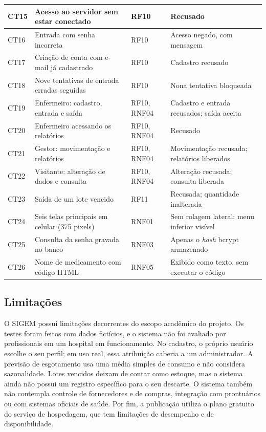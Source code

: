 \documentclass[12pt,a4paper]{article}
\begin{document}
{\begin{xltabular}{\textwidth}{|l|>{\raggedright\arraybackslash}X|l|>{\raggedright\arraybackslash}X|}
  CT15 & Acesso ao servidor sem estar conectado & RF10 & Recusado \\ \hline
  CT16 & Entrada com senha incorreta & RF10 & Acesso negado, com mensagem \\ \hline
  CT17 & Criação de conta com e-mail já cadastrado & RF10 & Cadastro recusado \\ \hline
  CT18 & Nove tentativas de entrada erradas seguidas & RF10 & Nona tentativa bloqueada \\ \hline
  CT19 & Enfermeiro: cadastro, entrada e saída & RF10, RNF04 & Cadastro e entrada recusados; saída aceita \\ \hline
  CT20 & Enfermeiro acessando os relatórios & RF10, RNF04 & Recusado \\ \hline
  CT21 & Gestor: movimentação e relatórios & RF10, RNF04 & Movimentação recusada; relatórios liberados \\ \hline
  CT22 & Visitante: alteração de dados e consulta & RF10, RNF04 & Alteração recusada; consulta liberada \\ \hline
  CT23 & Saída de um lote vencido & RF11 & Recusada; quantidade inalterada \\ \hline
  CT24 & Seis telas principais em celular (375 pixels) & RNF01 & Sem rolagem lateral; menu inferior visível \\ \hline
  CT25 & Consulta da senha gravada no banco & RNF03 & Apenas o \textit{hash} bcrypt armazenado \\ \hline
  CT26 & Nome de medicamento com código HTML & RNF05 & Exibido como texto, sem executar o código \\ \hline
\end{xltabular}
}

\subsection{Limitações}

O SIGEM possui limitações decorrentes do escopo acadêmico do projeto. Os testes foram feitos com dados fictícios, e o sistema não foi avaliado por profissionais em um hospital em funcionamento. No cadastro, o próprio usuário escolhe o seu perfil; em uso real, essa atribuição caberia a um administrador. A previsão de esgotamento usa uma média simples de consumo e não considera sazonalidade. Lotes vencidos deixam de contar como estoque, mas o sistema ainda não possui um registro específico para o seu descarte. O sistema também não contempla controle de fornecedores e de compras, integração com prontuários ou com sistemas oficiais de saúde. Por fim, a publicação utiliza o plano gratuito do serviço de hospedagem, que tem limitações de desempenho e de disponibilidade.
\end{document}

